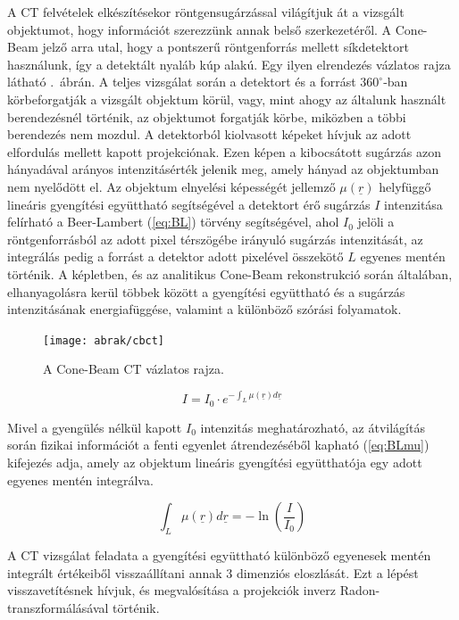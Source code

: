 \documentclass[a4paper,12pt]{article}
\begin{document}
A  CT felvételek elkészítésekor röntgensugárzással világítjuk át a vizsgált objektumot, hogy információt szerezzünk annak belső szerkezetéről. A Cone-Beam jelző arra utal, hogy a pontszerű röntgenforrás mellett síkdetektort használunk, így a detektált nyaláb kúp alakú. Egy ilyen elrendezés vázlatos rajza látható .~ábrán.  A teljes vizsgálat során a detektort és a forrást $360^\circ$-ban körbeforgatják a vizsgált objektum körül, vagy, mint ahogy az általunk használt berendezésnél történik, az objektumot forgatják körbe, miközben a többi berendezés nem mozdul. A detektorból kiolvasott képeket hívjuk az adott elfordulás mellett kapott projekciónak. Ezen képen a kibocsátott sugárzás azon hányadával arányos intenzitásérték jelenik meg, amely hányad az objektumban nem nyelődött el. Az objektum elnyelési képességét jellemző $\mu(\underline{r})$ helyfüggő lineáris gyengítési együttható segítségével a detektort érő sugárzás $I$ intenzitása felírható a Beer-Lambert (\ref{eq:BL}) törvény segítségével, ahol $I_0$ jelöli a röntgenforrásból az adott pixel térszögébe irányuló sugárzás intenzitását, az integrálás pedig a forrást a detektor adott pixelével összekötő $L$ egyenes mentén történik. A képletben, és az analitikus Cone-Beam rekonstrukció során általában, elhanyagolásra kerül többek között a gyengítési együttható és a sugárzás intenzitásának energiafüggése, valamint a különböző szórási folyamatok.  


\begin{figure}[htbp]
\center
\texttt{[image: abrak/cbct]}
\caption{A Cone-Beam CT vázlatos rajza\cite{noo}.}
\label{fig:cbct}
\end{figure}



\begin{equation}
\label{eq:BL}
I=I_0 \cdot e^{-\int_L \mu(\underline{r}) d\underline{r}}
\end{equation}


Mivel a gyengülés nélkül kapott $I_0$ intenzitás meghatározható, az átvilágítás során fizikai információt a fenti egyenlet átrendezéséből  kapható (\ref{eq:BLmu}) kifejezés adja, amely az objektum lineáris gyengítési együtthatója egy adott egyenes mentén integrálva.



\begin{equation}
\label{eq:BLmu}
{\int_L \mu(\underline{r}) d\underline{r}} = -\ln \left(\frac{I}{I_0} \right)
\end{equation}

A CT vizsgálat feladata a gyengítési együttható különböző egyenesek mentén integrált értékeiből visszaállítani annak 3 dimenziós eloszlását. Ezt a lépést visszavetítésnek hívjuk, és megvalósítása a projekciók inverz Radon-transzformálásával történik. 
\end{document}
